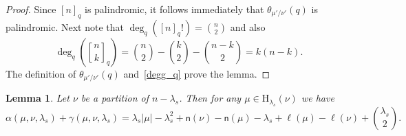 \documentclass[12pt,a4paper,reqno]{amsart}
\theoremstyle{plain}
\newtheorem{lemma}[theorem]{Lemma}
\theoremstyle{definition}
\newcommand{\1}{\mathds{1}}
\newcommand{\HH}{\mathrm{H}}
\newcommand{\fn}{\mathsf{n}}
\begin{document}
\begin{proof}
Since $[n]_q$ is palindromic, it follows immediately that $\theta_{\mu'/\nu'}(q)$ is palindromic. Next note that 
 $\deg_q([n]_q!)=\binom{n}{2}$ and also
\begin{equation}\label{degg_q}
    \deg_q\left( {n \brack k}_q\right)= \binom{n}{2}-\binom{k}{2}-\binom{n-k}{2}
=k(n-k).
\end{equation}    
The definition of $\theta_{\mu'/\nu'}(q)$ and~\cref{degg_q} prove the lemma. 
\end{proof}

\begin{lemma}\label{alph_simplify:lemma}
    Let $\nu$ be a partition of $n-\lambda_s$.
    Then for any $\mu\in\HH_{\lambda_s}(\nu)$ we have
    \begin{equation*}
        \alpha(\mu,\nu,\lambda_s)+\gamma(\mu,\nu,\lambda_s)=\lambda_s|\mu|-\lambda_s^2+\fn(\nu)-\fn(\mu)-\lambda_s+\ell(\mu)-\ell(\nu)+\binom{\lambda_s}{2}.
    \end{equation*}
\end{lemma}
\end{document}
